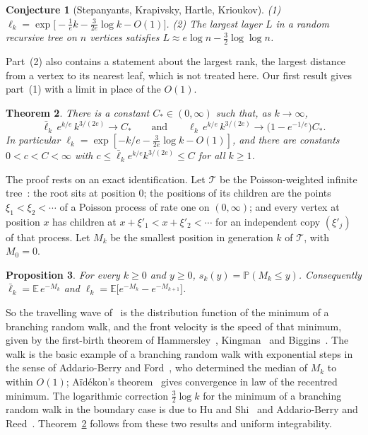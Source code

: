 \documentclass[11pt]{amsart}
\newtheorem{theorem}{Theorem}[section]
\newtheorem{proposition}[theorem]{Proposition}
\newtheorem{conjecture}[theorem]{Conjecture}
\theoremstyle{definition}
\theoremstyle{remark}
\numberwithin{equation}{section}
\newcommand{\PP}{\mathbb P}
\newcommand{\E}{\mathbb E}
\newcommand{\cT}{\mathcal T}
\newcommand{\lb}{\bar\ell}
\begin{document}
\begin{conjecture}[Stepanyants, Krapivsky, Hartle, Krioukov]\label{conj:SKHK}
\textup{(1)} $\ell_k=\exp\big[-\tfrac1e k-\tfrac{3}{2e}\log k-O(1)\big]$.
\textup{(2)} The largest layer $L$ in a random recursive tree on $n$ vertices satisfies $L\approx e\log n-\tfrac32\log\log n$.
\end{conjecture}

Part~(2) also contains a statement about the largest rank, the largest distance from a vertex to its nearest leaf, which is not treated here. Our first result gives part~(1) with a limit in place of the $O(1)$.

\begin{theorem}\label{thm:main}
There is a constant $C_*\in(0,\infty)$ such that, as $k\to\infty$,
\[
\lb_k\,e^{k/e}\,k^{3/(2e)}\to C_*\qquad\text{and}\qquad \ell_k\,e^{k/e}\,k^{3/(2e)}\to\big(1-e^{-1/e}\big)C_*.
\]
In particular $\ell_k=\exp[-k/e-\tfrac{3}{2e}\log k-O(1)]$, and there are constants $0<c<C<\infty$ with $c\le\lb_k e^{k/e}k^{3/(2e)}\le C$ for all $k\ge1$.
\end{theorem}

The proof rests on an exact identification. Let $\cT$ be the Poisson-weighted infinite tree~\cite{AS}: the root sits at position $0$; the positions of its children are the points $\xi_1<\xi_2<\cdots$ of a Poisson process of rate one on $(0,\infty)$; and every vertex at position $x$ has children at $x+\xi'_1<x+\xi'_2<\cdots$ for an independent copy $(\xi'_j)$ of that process. Let $M_k$ be the smallest position in generation $k$ of $\cT$, with $M_0=0$.

\begin{proposition}\label{prop:dict}
For every $k\ge0$ and $y\ge0$, $s_k(y)=\PP(M_k\le y)$. Consequently $\lb_k=\E\,e^{-M_k}$ and $\ell_k=\E\big[e^{-M_k}-e^{-M_{k+1}}\big]$.
\end{proposition}

So the travelling wave of~\cite[Appendix~A]{SKHK} is the distribution function of the minimum of a branching random walk, and the front velocity is the speed of that minimum, given by the first-birth theorem of Hammersley~\cite{Ham}, Kingman~\cite{Kin} and Biggins~\cite{Big}. The walk is the basic example of a branching random walk with exponential steps in the sense of Addario-Berry and Ford~\cite{ABF}, who determined the median of $M_k$ to within $O(1)$; A\"id\'ekon's theorem~\cite{Aid} gives convergence in law of the recentred minimum. The logarithmic correction $\tfrac32\log k$ for the minimum of a branching random walk in the boundary case is due to Hu and Shi~\cite{HS} and Addario-Berry and Reed~\cite{ABR}. Theorem~\ref{thm:main} follows from these two results and uniform integrability.
\end{document}

